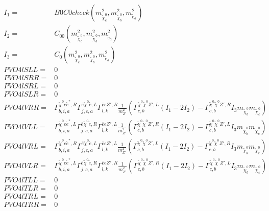 \documentclass[A4,landscape]{article}
\begin{document}
\begin{align} 
I_1= & B0C0check(m^2_{\tilde{\chi}^0_{{c}}}, m^2_{\tilde{\chi}^0_{{b}}}, m^2_{\tilde{e}_{{a}}}) \\ 
I_2= & C_{00}(m^2_{\tilde{\chi}^0_{{c}}}, m^2_{\tilde{\chi}^0_{{b}}}, m^2_{\tilde{e}_{{a}}}) \\ 
I_3= & C_0(m^2_{\tilde{\chi}^0_{{c}}}, m^2_{\tilde{\chi}^0_{{b}}}, m^2_{\tilde{e}_{{a}}}) \\ 
  PVO4lSLL= & 0 \\ 
  PVO4lSRR= & 0 \\ 
  PVO4lSRL= & 0 \\ 
  PVO4lSLR= & 0 \\ 
  PVO4lVRR= &  \Gamma^{\tilde{\chi}^0 e \tilde{e}^*,R}_{b, i, a} \Gamma^{\bar{e}\tilde{\chi}^0 \tilde{e} ,L}_{j, c, a} \Gamma^{\bar{e}e {Z'} ,R}_{l, k} \frac{1}{m^2_{{Z'}}} (\Gamma^{\tilde{\chi}^0 \tilde{\chi}^0 {Z'} ,L}_{c, b} (I_1 - 2 I_2) - \Gamma^{\tilde{\chi}^0 \tilde{\chi}^0 {Z'} ,R}_{c, b} I_3 m_{\tilde{\chi}^0_{{b}}} m_{\tilde{\chi}^0_{{c}}}) \\ 
  PVO4lVLL= &  \Gamma^{\tilde{\chi}^0 e \tilde{e}^*,L}_{b, i, a} \Gamma^{\bar{e}\tilde{\chi}^0 \tilde{e} ,R}_{j, c, a} \Gamma^{\bar{e}e {Z'} ,L}_{l, k} \frac{1}{m^2_{{Z'}}} (\Gamma^{\tilde{\chi}^0 \tilde{\chi}^0 {Z'} ,R}_{c, b} (I_1 - 2 I_2) - \Gamma^{\tilde{\chi}^0 \tilde{\chi}^0 {Z'} ,L}_{c, b} I_3 m_{\tilde{\chi}^0_{{b}}} m_{\tilde{\chi}^0_{{c}}}) \\ 
  PVO4lVRL= &  \Gamma^{\tilde{\chi}^0 e \tilde{e}^*,R}_{b, i, a} \Gamma^{\bar{e}\tilde{\chi}^0 \tilde{e} ,L}_{j, c, a} \Gamma^{\bar{e}e {Z'} ,L}_{l, k} \frac{1}{m^2_{{Z'}}} (\Gamma^{\tilde{\chi}^0 \tilde{\chi}^0 {Z'} ,L}_{c, b} (I_1 - 2 I_2) - \Gamma^{\tilde{\chi}^0 \tilde{\chi}^0 {Z'} ,R}_{c, b} I_3 m_{\tilde{\chi}^0_{{b}}} m_{\tilde{\chi}^0_{{c}}}) \\ 
  PVO4lVLR= &  \Gamma^{\tilde{\chi}^0 e \tilde{e}^*,L}_{b, i, a} \Gamma^{\bar{e}\tilde{\chi}^0 \tilde{e} ,R}_{j, c, a} \Gamma^{\bar{e}e {Z'} ,R}_{l, k} \frac{1}{m^2_{{Z'}}} (\Gamma^{\tilde{\chi}^0 \tilde{\chi}^0 {Z'} ,R}_{c, b} (I_1 - 2 I_2) - \Gamma^{\tilde{\chi}^0 \tilde{\chi}^0 {Z'} ,L}_{c, b} I_3 m_{\tilde{\chi}^0_{{b}}} m_{\tilde{\chi}^0_{{c}}}) \\ 
  PVO4lTLL= & 0 \\ 
  PVO4lTLR= & 0 \\ 
  PVO4lTRL= & 0 \\ 
  PVO4lTRR= & 0 \\ 
\end{align} 
\end{document}
